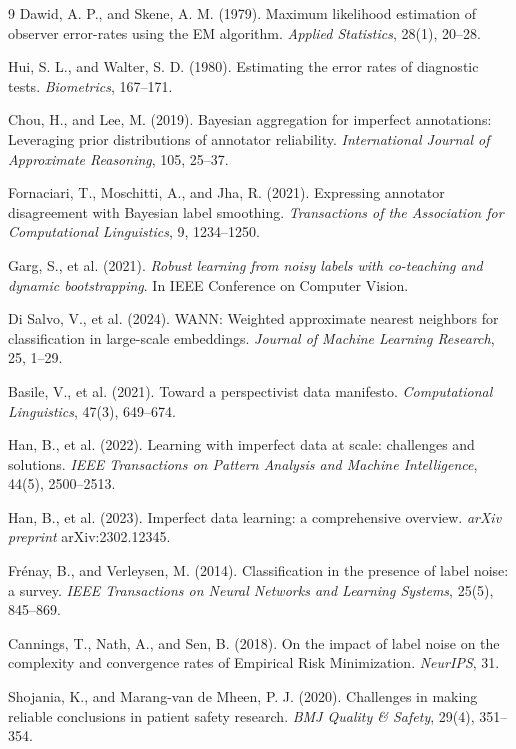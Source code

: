\documentclass[12pt]{article}
\begin{document}

\begin{thebibliography}{9}
Dawid, A. P., and Skene, A. M. (1979). Maximum likelihood estimation of observer error-rates using the EM algorithm. \textit{Applied Statistics}, 28(1), 20--28.

Hui, S. L., and Walter, S. D. (1980). Estimating the error rates of diagnostic tests. \textit{Biometrics}, 167--171.

Chou, H., and Lee, M. (2019). Bayesian aggregation for imperfect annotations: Leveraging prior distributions of annotator reliability. \textit{International Journal of Approximate Reasoning}, 105, 25--37.

Fornaciari, T., Moschitti, A., and Jha, R. (2021). Expressing annotator disagreement with Bayesian label smoothing. \textit{Transactions of the Association for Computational Linguistics}, 9, 1234--1250.

Garg, S., et al. (2021). \textit{Robust learning from noisy labels with co-teaching and dynamic bootstrapping}. In IEEE Conference on Computer Vision.

Di Salvo, V., et al. (2024). WANN: Weighted approximate nearest neighbors for classification in large-scale embeddings. \textit{Journal of Machine Learning Research}, 25, 1--29.

Basile, V., et al. (2021). Toward a perspectivist data manifesto. \textit{Computational Linguistics}, 47(3), 649--674.

Han, B., et al. (2022). Learning with imperfect data at scale: challenges and solutions. \textit{IEEE Transactions on Pattern Analysis and Machine Intelligence}, 44(5), 2500--2513.

Han, B., et al. (2023). Imperfect data learning: a comprehensive overview. \textit{arXiv preprint} arXiv:2302.12345.

Fr\'enay, B., and Verleysen, M. (2014). Classification in the presence of label noise: a survey. \textit{IEEE Transactions on Neural Networks and Learning Systems}, 25(5), 845--869.

Cannings, T., Nath, A., and Sen, B. (2018). On the impact of label noise on the complexity and convergence rates of Empirical Risk Minimization. \textit{NeurIPS}, 31.

Shojania, K., and Marang-van de Mheen, P. J. (2020). Challenges in making reliable conclusions in patient safety research. \textit{BMJ Quality \& Safety}, 29(4), 351--354.


\end{thebibliography}
\end{document}
